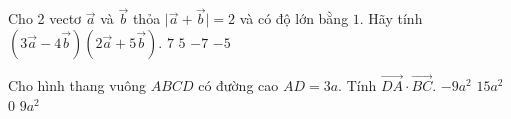 \begin{ex}%
	Cho 2 vectơ $\overrightarrow{a} $ và $\overrightarrow{b} $ thỏa $\big| \overrightarrow{a}+\overrightarrow{b}\big| =2$ và có độ lớn bằng $ 1 $. Hãy tính $\left(3\overrightarrow{a}-4\overrightarrow{b}\right)\left(2\overrightarrow{a}+5\overrightarrow{b}\right)$.
	\choice
	{$7$}
	{$5$}
	{\True $-7$}
	{$-5$}
\end{ex}
\begin{ex}%
	Cho hình thang vuông $ABCD$ có đường cao $AD=3a$. Tính $\overrightarrow{DA}\cdot \overrightarrow{BC}$.
	\choice
	{\True $-9a^2$}
	{$15a^2$}
	{$0$}
	{$9a^2$}
\end{ex}


